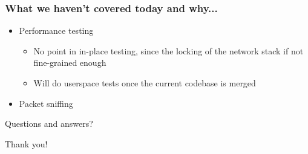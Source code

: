 \documentclass[magyar]{beamer}
\begin{document}
\begin{frame}
\frametitle{What we haven't covered today and why...}
\begin{itemize}
	\item Performance testing
		\begin{itemize}
			\item No point in in-place testing, since the locking of the network stack if not fine-grained enough
			\item Will do userspace tests once the current codebase is merged
		\end{itemize}
	\item Packet sniffing
\end{itemize}
\end{frame}

\begin{frame}
\begin{center}
Questions and answers?
\end{center}
\end{frame}

\begin{frame}
\begin{center}
Thank you!
\end{center}
\end{frame}
\end{document}
